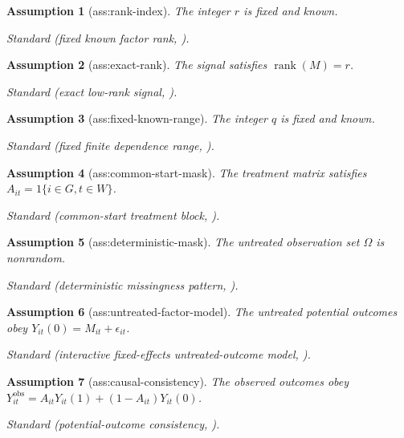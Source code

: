 \documentclass{article}
\newtheorem{assumption}{Assumption}
\begin{document}
\begin{assumption}[ass:rank-index]\label{ass:rank-index}
The integer \(r\) is fixed and known.
\par\smallskip\noindent\emph{Standard} (fixed known factor rank, \cite{choiYuan2024MNAR}).
\end{assumption}

\begin{assumption}[ass:exact-rank]\label{ass:exact-rank}
The signal satisfies \(\operatorname{rank}(M)=r\).
\par\smallskip\noindent\emph{Standard} (exact low-rank signal, \cite{choiYuan2024MNAR}).
\end{assumption}

\begin{assumption}[ass:fixed-known-range]\label{ass:fixed-known-range}
The integer \(q\) is fixed and known.
\par\smallskip\noindent\emph{Standard} (fixed finite dependence range, \cite{choiYuan2025WeakFactors}).
\end{assumption}

\begin{assumption}[ass:common-start-mask]\label{ass:common-start-mask}
The treatment matrix satisfies \(A_{it}=1\{i\in G,t\in W\}\).
\par\smallskip\noindent\emph{Standard} (common-start treatment block, \cite{choiYuan2024MNAR}).
\end{assumption}

\begin{assumption}[ass:deterministic-mask]\label{ass:deterministic-mask}
The untreated observation set \(\Omega\) is nonrandom.
\par\smallskip\noindent\emph{Standard} (deterministic missingness pattern, \cite{choiYuan2024MNAR}).
\end{assumption}

\begin{assumption}[ass:untreated-factor-model]\label{ass:untreated-factor-model}
The untreated potential outcomes obey \(Y_{it}(0)=M_{it}+\epsilon_{it}\).
\par\smallskip\noindent\emph{Standard} (interactive fixed-effects untreated-outcome model, \cite{atheyEtAl2021MatrixCompletion}).
\end{assumption}

\begin{assumption}[ass:causal-consistency]\label{ass:causal-consistency}
The observed outcomes obey \(Y^{\mathrm{obs}}_{it}=A_{it}Y_{it}(1)+(1-A_{it})Y_{it}(0)\).
\par\smallskip\noindent\emph{Standard} (potential-outcome consistency, \cite{atheyEtAl2021MatrixCompletion}).
\end{assumption}
\end{document}
